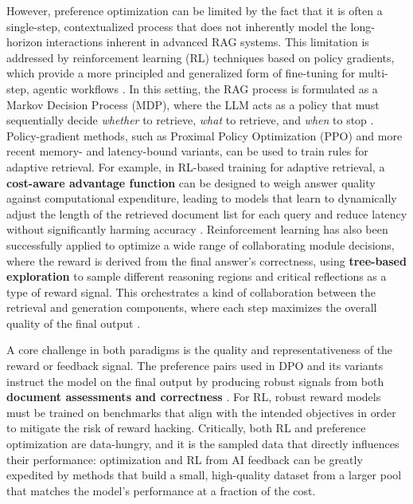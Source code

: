 \documentclass[11pt,a4paper]{article}
\begin{document}
However, preference optimization can be limited by the fact that it is often a single-step, contextualized process that does not inherently model the long-horizon interactions inherent in advanced RAG systems. This limitation is addressed by reinforcement learning (RL) techniques based on policy gradients, which provide a more principled and generalized form of fine-tuning for multi-step, agentic workflows \cite{arxiv:2502.01142v2}. In this setting, the RAG process is formulated as a Markov Decision Process (MDP), where the LLM acts as a policy that must sequentially decide \emph{whether} to retrieve, \emph{what} to retrieve, and \emph{when} to stop \cite{arxiv:2502.01142v2,arxiv:2510.12323v1}. Policy-gradient methods, such as Proximal Policy Optimization (PPO) and more recent memory- and latency-bound variants, can be used to train rules for adaptive retrieval. For example, in RL-based training for adaptive retrieval, a \textbf{cost-aware advantage function} can be designed to weigh answer quality against computational expenditure, leading to models that learn to dynamically adjust the length of the retrieved document list for each query and reduce latency without significantly harming accuracy \cite{arxiv:2510.15719v1}. Reinforcement learning has also been successfully applied to optimize a wide range of collaborating module decisions, where the reward is derived from the final answer's correctness, using \textbf{tree-based exploration} to sample different reasoning regions and critical reflections as a type of reward signal. This orchestrates a kind of collaboration between the retrieval and generation components, where each step maximizes the overall quality of the final output \cite{arxiv:2606.28566v1}.

A core challenge in both paradigms is the quality and representativeness of the reward or feedback signal. The preference pairs used in DPO and its variants instruct the model on the final output by producing robust signals from both \textbf{document assessments and correctness} \cite{arxiv:2604.22849v1}. For RL, robust reward models must be trained on benchmarks that align with the intended objectives in order to mitigate the risk of reward hacking. Critically, both RL and preference optimization are data-hungry, and it is the sampled data that directly influences their performance: optimization and RL from AI feedback can be greatly expedited by methods that build a small, high-quality dataset from a larger pool that matches the model's performance at a fraction of the cost.
\end{document}
